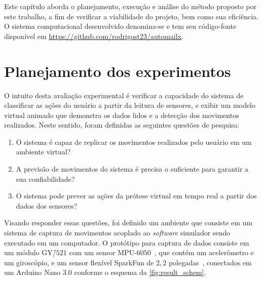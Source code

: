 Este capítulo aborda o planejamento, execução e análise do método proposto por este trabalho, a fim de verificar a viabilidade do projeto, bem como sua eficiência. O sistema computacional desenvolvido denomina-se \productname{} e tem seu código-fonte disponível em \url{https://github.com/rodrigost23/automailx}.

%
\section{Planejamento dos experimentos}\label{sec:result_planejamento}
%

O intuito desta avaliação experimental é verificar a capacidade do sistema \productname{} de classificar as ações do usuário a partir da leitura de sensores, e exibir um modelo virtual animado que demonstra os dados lidos e a detecção dos movimentos realizados. Neste sentido, foram definidas as seguintes questões de pesquisa:

\begin{enumerate}[label=\textbf{QP\arabic*:}, ref=QP\arabic*]
    \item O sistema \productname{} é capaz de replicar os movimentos realizados pelo usuário em um ambiente virtual?\label{qp:simula_movimentos}
    \item A previsão de movimentos do sistema \productname{} é precisa o suficiente para garantir a sua confiabilidade?\label{qp:acuracia}
    \item O sistema \productname{} pode prever as ações da prótese virtual em tempo real a partir dos dados dos sensores?\label{qp:previsao_sensores}
\end{enumerate}

Visando responder essas questões, foi definido um ambiente que consiste em um sistema de captura de movimentos acoplado ao \textit{software} simulador sendo executado em um computador.
% 
% 
O protótipo para captura de dados consiste em um módulo GY\=/\(521\) com um sensor MPU-\(6050\)~\cite{invensense:imu_mpu}, que contém um acelerômetro e um giroscópio, e um sensor flexível SparkFun de \(2{,}2\) polegadas~\cite{flex:datasheet}, conectados em um Arduino Nano 3.0 conforme o esquema da \autoref{fig:result_schem}.

